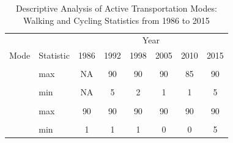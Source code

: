 \documentclass[
11pt, %
oneside, %
english, %
singlespacing, %
]{macthesis} %
\begin{document}
\begin{longtable}[t]{>{}llcccccc}
\caption{\label{tab:unnamed-chunk-14}\label{tab:table_13}Descriptive Analysis of Active Transportation Modes: Walking and Cycling Statistics from 1986 to 2015}\\
\toprule
\multicolumn{2}{c}{ } & \multicolumn{6}{c}{Year} \\
\cmidrule(l{3pt}r{3pt}){3-8}
Mode & Statistic & 1986 & 1992 & 1998 & 2005 & 2010 & 2015\\
\midrule
\textbf{\cellcolor{gray!6}{cycling}} & \cellcolor{gray!6}{Count} & \cellcolor{gray!6}{NA} & \cellcolor{gray!6}{126} & \cellcolor{gray!6}{119} & \cellcolor{gray!6}{330} & \cellcolor{gray!6}{230} & \cellcolor{gray!6}{240}\\
\cmidrule{1-8}\pagebreak[0]
\textbf{} & max & NA & 90 & 90 & 90 & 85 & 90\\
\cmidrule{1-8}\pagebreak[0]
\textbf{\cellcolor{gray!6}{}} & \cellcolor{gray!6}{mean} & \cellcolor{gray!6}{NA} & \cellcolor{gray!6}{24} & \cellcolor{gray!6}{21} & \cellcolor{gray!6}{18} & \cellcolor{gray!6}{18} & \cellcolor{gray!6}{22}\\
\cmidrule{1-8}\pagebreak[0]
\textbf{} & min & NA & 5 & 2 & 1 & 1 & 5\\
\cmidrule{1-8}\pagebreak[0]
\textbf{\cellcolor{gray!6}{NA}} & \cellcolor{gray!6}{Count} & \cellcolor{gray!6}{4229} & \cellcolor{gray!6}{1473} & \cellcolor{gray!6}{1657} & \cellcolor{gray!6}{5517} & \cellcolor{gray!6}{4360} & \cellcolor{gray!6}{3217}\\
\cmidrule{1-8}\pagebreak[0]
\textbf{} & max & 90 & 90 & 90 & 90 & 90 & 90\\
\cmidrule{1-8}\pagebreak[0]
\textbf{\cellcolor{gray!6}{}} & \cellcolor{gray!6}{mean} & \cellcolor{gray!6}{17} & \cellcolor{gray!6}{17} & \cellcolor{gray!6}{10} & \cellcolor{gray!6}{12} & \cellcolor{gray!6}{12} & \cellcolor{gray!6}{16}\\
\cmidrule{1-8}\pagebreak[0]
\textbf{} & min & 1 & 1 & 1 & 0 & 0 & 5\\
\bottomrule
\end{longtable}
\endgroup{}
\end{document}
